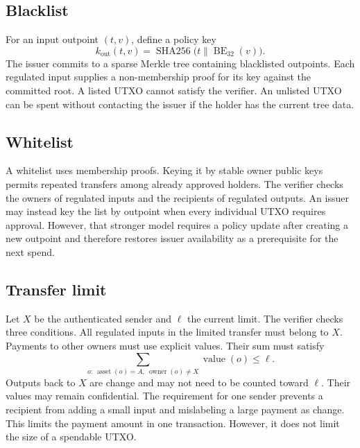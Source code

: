 \documentclass[11pt]{article}
\newcommand{\sha}{\operatorname{SHA256}}
\newcommand{\concat}{\mathbin\|}
\begin{document}
    \subsection{Blacklist}

    For an input outpoint $(t,v)$, define a policy key
    \begin{equation}
        k_{\mathrm{out}}(t,v)=\sha\bigl(t\concat\operatorname{BE}_{32}(v)\bigr).
    \end{equation}
    The issuer commits to a sparse Merkle tree containing blacklisted outpoints.
    Each regulated input supplies a non-membership proof for its key against the committed root.
    A listed UTXO cannot satisfy the verifier.
    An unlisted UTXO can be spent without contacting the issuer if the holder has the current tree data.

    \subsection{Whitelist}

    A whitelist uses membership proofs.
    Keying it by stable owner public keys permits repeated transfers among already approved holders.
    The verifier checks the owners of regulated inputs and the recipients of regulated outputs.
    An issuer may instead key the list by outpoint when every individual UTXO requires approval.
    However, that stronger model requires a policy update after creating a new outpoint and therefore restores issuer availability as a prerequisite for the next spend.

    \subsection{Transfer limit}

    Let $X$ be the authenticated sender and $\ell$ the current limit.
    The verifier checks three conditions.
    All regulated inputs in the limited transfer must belong to $X$.
    Payments to other owners must use explicit values.
    Their sum must satisfy
    \begin{equation}
        \sum_{o:\,\operatorname{asset}(o)=A,\ \operatorname{owner}(o)\ne X}
        \operatorname{value}(o)\leq\ell.
    \end{equation}
    Outputs back to $X$ are change and may not need to be counted toward $\ell$.
    Their values may remain confidential.
    The requirement for one sender prevents a recipient from adding a small input and mislabeling a large payment as change.
    This limits the payment amount in one transaction.
    However, it does not limit the size of a spendable UTXO.
\end{document}
